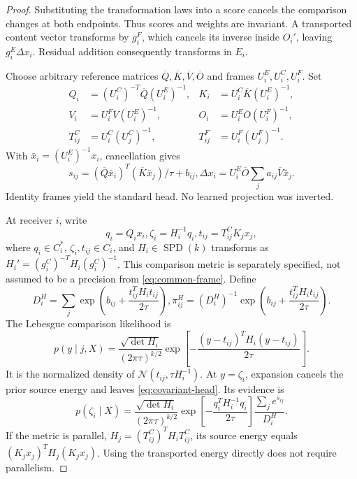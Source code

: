 \documentclass[11pt]{article}
\newcommand{\SPD}{\operatorname{SPD}}
\begin{document}
\begin{proof}
Substituting the transformation laws into a score cancels the comparison changes at both endpoints. Thus scores and weights are invariant. A transported content vector transforms by $g_i^F$, which cancels its inverse inside $O_i'$, leaving $g_i^E\Delta x_i$. Residual addition consequently transforms in $E_i$.

Choose arbitrary reference matrices $\overline Q,\overline K,\overline V,\overline O$ and frames $U_i^E,U_i^C,U_i^F$. Set
\begin{align}
Q_i&=(U_i^C)^{-T}\overline Q(U_i^E)^{-1},&
K_i&=U_i^C\overline K(U_i^E)^{-1},\\
V_i&=U_i^F\overline V(U_i^E)^{-1},&
O_i&=U_i^E\overline O(U_i^F)^{-1},\\
T^C_{ij}&=U_i^C(U_j^C)^{-1},&T^F_{ij}&=U_i^F(U_j^F)^{-1}.
\label{eq:flat-witness}
\end{align}
With $\bar x_i=(U_i^E)^{-1}x_i$, cancellation gives
\begin{equation}
s_{ij}=(\overline Q\bar x_i)^T(\overline K\bar x_j)/\tau+b_{ij},
\Delta x_i=U_i^E\overline O\sum_ja_{ij}\overline V\bar x_j.
\end{equation}
Identity frames yield the standard head. No learned projection was inverted.

At receiver $i$, write
\begin{equation}
q_i=Q_ix_i, \zeta_i=H_i^{-1}q_i, t_{ij}=T^C_{ij}K_jx_j,
\end{equation}
where $q_i\in C_i^*$, $\zeta_i,t_{ij}\in C_i$, and $H_i\in\SPD(k)$ transforms as $H_i'=(g_i^C)^{-T}H_i(g_i^C)^{-1}$. This comparison metric is separately specified, not assumed to be a precision from \eqref{eq:common-frame}. Define
\begin{equation}
D_i^H=\sum_j\exp\left(b_{ij}+\frac{t_{ij}^TH_it_{ij}}{2\tau}\right),
\pi_{ij}^H=(D_i^H)^{-1}\exp\left(b_{ij}+\frac{t_{ij}^TH_it_{ij}}{2\tau}\right).
\end{equation}
The Lebesgue comparison likelihood is
\begin{equation}
p(y\mid j,X)=\frac{\sqrt{\det H_i}}{(2\pi\tau)^{k/2}}
\exp\left[-\frac{(y-t_{ij})^TH_i(y-t_{ij})}{2\tau}\right].
\label{eq:metric-gaussian}
\end{equation}
It is the normalized density of $\mathcal N(t_{ij},\tau H_i^{-1})$. At $y=\zeta_i$, expansion cancels the prior source energy and leaves \eqref{eq:covariant-head}. Its evidence is
\begin{equation}
p(\zeta_i\mid X)=\frac{\sqrt{\det H_i}}{(2\pi\tau)^{k/2}}
\exp\left[-\frac{q_i^TH_i^{-1}q_i}{2\tau}\right]
\frac{\sum_j e^{s_{ij}}}{D_i^H}.
\label{eq:metric-evidence}
\end{equation}
If the metric is parallel, $H_j=(T^C_{ij})^TH_iT^C_{ij}$, its source energy equals $(K_jx_j)^TH_j(K_jx_j)$. Using the transported energy directly does not require parallelism.


\end{proof}
\end{document}
